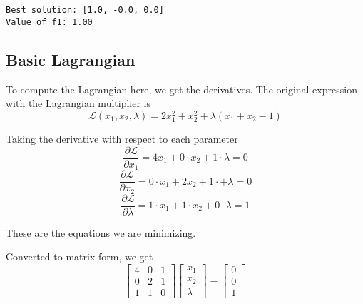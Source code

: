 \documentclass[11pt]{article}
\begin{document}
    \begin{Verbatim}[commandchars=\\\{\}]
Best solution: [1.0, -0.0, 0.0]
Value of f1: 1.00
    \end{Verbatim}

    \subsection{Basic Lagrangian}\label{basic-lagrangian}

    To compute the Lagrangian here, we get the derivatives. The original
expression with the Lagrangian multiplier is
\[\mathcal{L}(x_1, x_2, \lambda) = 2x_1^2 + x_2^2 + \lambda(x_1 + x_2 - 1)\]

Taking the derivative with respect to each parameter
\[\frac{\partial \mathcal{L}}{\partial x_1} = 4x_1 + 0 \cdot x_2 + 1 \cdot \lambda = 0\]
\[\frac{\partial \mathcal{L}}{\partial x_2} = 0 \cdot x_1 + 2x_2 + 1 \cdot + \lambda = 0\]
\[\frac{\partial \mathcal{L}}{\partial \lambda} = 1 \cdot x_1 + 1\cdot x_2 + 0 \cdot \lambda = 1\]

These are the equations we are minimizing.

Converted to matrix form, we get
\[\begin{bmatrix} 4 & 0 & 1 \\ 0 & 2 & 1 \\ 1 & 1 & 0 \end{bmatrix} \begin{bmatrix} x_1 \\ x_2 \\ \lambda \end{bmatrix} = \begin{bmatrix} 0 \\ 0 \\ 1 \end{bmatrix}\]
\end{document}
